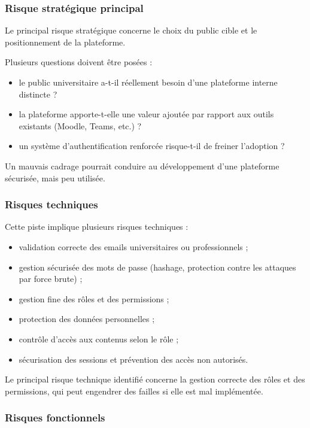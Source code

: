 \documentclass[12pt,a4paper]{report}
\begin{document}
\subsubsection{Risque stratégique principal}

Le principal risque stratégique concerne le choix du public cible et le positionnement
de la plateforme.

Plusieurs questions doivent être posées :
\begin{itemize}
  \item le public universitaire a-t-il réellement besoin d’une plateforme interne distincte ?
  \item la plateforme apporte-t-elle une valeur ajoutée par rapport aux outils existants
  (Moodle, Teams, etc.) ?
  \item un système d’authentification renforcée risque-t-il de freiner l’adoption ?
\end{itemize}

Un mauvais cadrage pourrait conduire au développement d’une plateforme sécurisée,
mais peu utilisée.

\subsubsection{Risques techniques}

Cette piste implique plusieurs risques techniques :
\begin{itemize}
  \item validation correcte des emails universitaires ou professionnels ;
  \item gestion sécurisée des mots de passe (hashage, protection contre les attaques
  par force brute) ;
  \item gestion fine des rôles et des permissions ;
  \item protection des données personnelles ;
  \item contrôle d’accès aux contenus selon le rôle ;
  \item sécurisation des sessions et prévention des accès non autorisés.
\end{itemize}

Le principal risque technique identifié concerne la gestion correcte des rôles et des
permissions, qui peut engendrer des failles si elle est mal implémentée.

\subsubsection{Risques fonctionnels}
\end{document}
